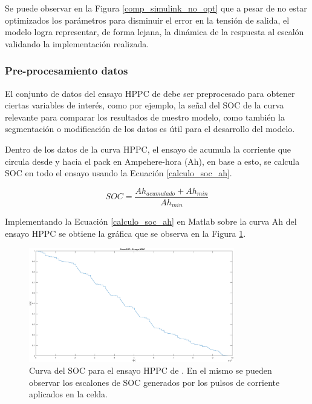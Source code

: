 \documentclass[10pt,a4paper]{article}
\newcounter{subsubsubsection}[subsubsection]
\begin{document}
Se puede observar en la Figura \ref{comp_simulink_no_opt} que a pesar de no
estar optimizados los parámetros para disminuir el error en la tensi\'on de
salida, el modelo logra representar, de forma lejana, la din\'amica de la
respuesta al escal\'on validando la implementación realizada.


\subsubsection{Pre-procesamiento datos}\label{data_preprocessing}

El conjunto de datos del ensayo \acrshort{HPPC} de \cite{Kollmeyer2018} debe ser
preprocesado para obtener ciertas variables de inter\'es, como por ejemplo, la
señal del \acrshort{SOC} de la curva relevante para comparar los resultados de
nuestro modelo, como tambi\'en la segmentaci\'on o modificaci\'on de los datos
es \'util para el desarrollo del modelo.


Dentro de los datos de la curva \acrshort{HPPC}, el ensayo de
\cite{Kollmeyer2018} acumula la corriente que circula desde y hacia el pack en
Ampehere-hora (Ah), en base a esto, se calcula \acrshort{SOC} en todo el ensayo
usando la Ecuaci\'on \ref{calculo_soc_ah}.

\begin{equation}
    SOC = \frac{Ah_{acumulado} + Ah_{min}}{Ah_{min}} \label{calculo_soc_ah}
\end{equation}

Implementando la Ecuaci\'on \ref{calculo_soc_ah} en Matlab sobre la curva Ah del
ensayo \acrshort{HPPC} se obtiene la gr\'afica que se observa en la Figura
\ref{soc_hppc_data}.

\begin{figure}[h!]
    \begin{center}
        \includegraphics[width=0.8\textwidth]{soc_hppc_data.eps}
        \caption{Curva del \acrshort{SOC} para el ensayo HPPC de
        \cite{Kollmeyer2018}. En el mismo se pueden observar los escalones de
        \acrshort{SOC} generados por los pulsos de corriente aplicados en la
        celda.}
        \label{soc_hppc_data}
    \end{center}
\end{figure}
\FloatBarrier
\end{document}
